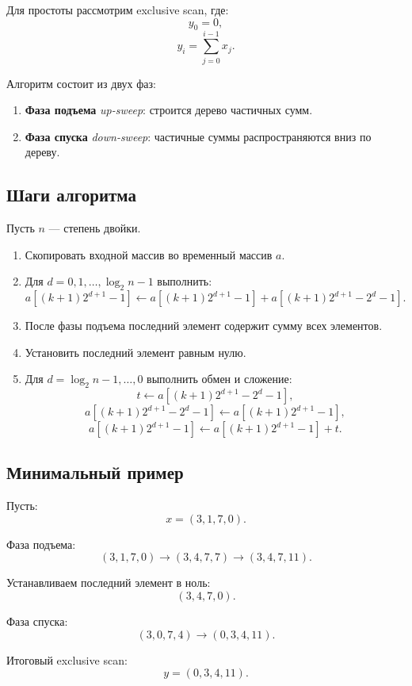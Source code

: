 \documentclass[12pt,a4paper]{article}
\begin{document}
Для простоты рассмотрим exclusive scan, где:
\[
    y_0 = 0,
\]
\[
    y_i = \sum_{j=0}^{i-1} x_j.
\]

Алгоритм состоит из двух фаз:

\begin{enumerate}
    \item \textbf{Фаза подъема} \emph{up-sweep}: строится дерево частичных сумм.
    \item \textbf{Фаза спуска} \emph{down-sweep}: частичные суммы распространяются вниз по дереву.
\end{enumerate}

\subsection{Шаги алгоритма}

Пусть $n$ --- степень двойки.

\begin{enumerate}
    \item Скопировать входной массив во временный массив $a$.
    \item Для $d = 0,1,\dots,\log_2 n - 1$ выполнить:
    \[
        a[(k+1)2^{d+1}-1] \gets
        a[(k+1)2^{d+1}-1] + a[(k+1)2^{d+1}-2^d-1].
    \]
    \item После фазы подъема последний элемент содержит сумму всех элементов.
    \item Установить последний элемент равным нулю.
    \item Для $d = \log_2 n - 1,\dots,0$ выполнить обмен и сложение:
    \[
        t \gets a[(k+1)2^{d+1}-2^d-1],
    \]
    \[
        a[(k+1)2^{d+1}-2^d-1] \gets a[(k+1)2^{d+1}-1],
    \]
    \[
        a[(k+1)2^{d+1}-1] \gets a[(k+1)2^{d+1}-1] + t.
    \]
\end{enumerate}

\subsection{Минимальный пример}

Пусть:
\[
    x = (3,1,7,0).
\]

Фаза подъема:
\[
    (3,1,7,0)
    \to
    (3,4,7,7)
    \to
    (3,4,7,11).
\]

Устанавливаем последний элемент в ноль:
\[
    (3,4,7,0).
\]

Фаза спуска:
\[
    (3,0,7,4)
    \to
    (0,3,4,11).
\]

Итоговый exclusive scan:
\[
    y = (0,3,4,11).
\]
\end{document}
